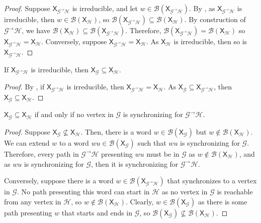 \documentclass[hidelinks]{article}
\newcommand{\Gc}{\mathcal{G}}  %
\newcommand{\Hc}{\mathcal{H}}  %
\newcommand{\Bc}{\mathcal{B}}
\newcommand{\GtH}{{\Gc^\to\Hc}}
\newcommand{\shift}[1]{\mathsf{X}_{#1}}
\theoremstyle{definition}
\begin{document}
\begin{proof}
    Suppose \(\shift{\GtH}\) is irreducible, and let \(w \in \Bc(\shift{\GtH})\). By , 
    as \(\shift{\GtH}\) is irreducible, then \(w \in \Bc(\shift{\Hc})\), so \(\Bc(\shift{\GtH}) \subseteq \Bc(\shift{\Hc})\).
    By construction of \(\GtH\), we have \(\Bc(\shift{\Hc}) \subseteq \Bc(\shift{\GtH})\). Therefore, 
    \(\Bc(\shift{\GtH}) = \Bc(\shift{\Hc})\) so \(\shift{\GtH} = \shift{\Hc}\).
    Conversely, suppose \(\shift{\GtH} = \shift{\Hc}\). As \(\shift{\Hc}\) is irreducible, then so 
    is \(\shift{\GtH}\).
\end{proof}

\begin{corollary}\label{irrsubshift}
    If \(\shift{\GtH}\) is irreducible, then \(\shift{\Gc} \subseteq \shift{\Hc}\).
\end{corollary}

\begin{proof}
    By , if \(\shift{\GtH}\) is irreducible, then \(\shift{\GtH} = \shift{\Hc}\).
    As \(\shift{\Gc} \subseteq \shift{\GtH}\), then \(\shift{\Gc} \subseteq \shift{\Hc}\).
\end{proof}

\begin{theorem}\label{subshiftsyncequiv}
    \(\shift{\Gc} \subseteq \shift{\Hc}\) if and only if no vertex in \(\Gc\) is synchronizing for 
    \(\GtH\).
\end{theorem}

\begin{proof}
    Suppose \(\shift{\Gc} \nsubseteq \shift{\Hc}\). Then, there is a word \(w \in \Bc(\shift{\Gc})\) 
    but \(w \notin \Bc(\shift{\Hc})\). We can extend \(w\) to a word \(wu \in \Bc(\shift{\Gc})\) such 
    that \(wu\) is synchronizing for \(\Gc\). Therefore, every path in \(\GtH\) presenting \(wu\) 
    must be in \(\Gc\) as \(w \notin \Bc(\shift{\Hc})\), and as \(wu\) is synchronizing 
    for \(\Gc\), then it is synchronizing for \(\GtH\).

    Conversely, suppose there is a word \(w \in \Bc(\shift{\GtH})\) that synchronizes to a vertex in \(\Gc\).
    No path presenting this word can start in \(\Hc\) as no vertex in \(\Gc\) is reachable from any 
    vertex in \(\Hc\), so \(w \notin \Bc(\shift{\Hc})\). Clearly, \(w \in \Bc(\shift{\Gc})\) 
    as there is some path presenting \(w\) that starts and ends in \(\Gc\), so 
    \(\Bc(\shift{\Gc}) \nsubseteq \Bc(\shift{\Hc})\).
\end{proof}
\end{document}
